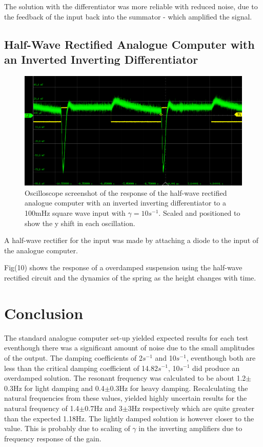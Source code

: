 \documentclass[journal]{Imperial_lab_report}
\begin{document}
    The solution with the differentiator was more reliable with reduced noise, due to the feedback of the input back into the summator - which amplified the signal.

    \subsection{Half-Wave Rectified Analogue Computer with an Inverted Inverting Differentiator}
    
    \begin{figure}[h]
        \centering
        \includegraphics[scale = 0.25]{G_10_R.png}
        \caption{ Oscilloscope screenshot of the response of the half-wave rectified analogue computer with an inverted inverting differentiator to a 100mHz square wave input with $\gamma=10$$s^{-1}$. Scaled and positioned to show the y shift in each oscillation.}
    \end{figure}

    A half-wave rectifier for the input was made by attaching a diode to the input of the analogue computer.

    Fig(10) shows the response of a overdamped suspension using the half-wave rectified circuit and the dynamics of the spring as the height changes with time.
    


    \section{Conclusion}

    The standard analogue computer set-up yielded expected results for each test eventhough there was a significant amount of noise due to the small amplitudes of the output. The damping coefficients of 2$s^{-1}$ and 10$s^{-1}$, eventhough both are less than the critical damping coefficient of 14.82$s^{-1}$, 10$s^{-1}$ did produce an overdamped solution. The resonant frequency was calculated to be about 1.2$\pm$0.3Hz for light damping and 0.4$\pm$0.3Hz for heavy damping. Recalculating the natural frequencies from these values, yielded highly uncertain results for the natural frequency of 1.4$\pm$0.7Hz and 3$\pm$3Hz respectively which are quite greater than the expected 1.18Hz. The lightly damped solution is however closer to the value. This is probably due to scaling of $\gamma$ in the inverting amplifiers due to frequency response of the gain.
    
\end{document}
